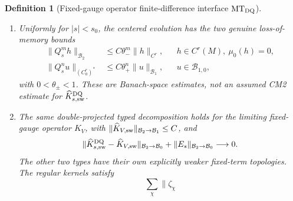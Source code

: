 \documentclass[11pt]{article}
\newtheorem{definition}[theorem]{Definition}
\newcommand{\cB}{\mathcal B}
\begin{document}
\begin{definition}[Fixed-gauge operator finite-difference interface
$\mathrm{MT}_{\rm DQ}$]
\begin{enumerate}[label=\textup{(MT\arabic*)}]
      while the graph-supported part belongs to the existing physical face
      atlas and obeys the uniform strong face ledger
      \begin{equation}
      \label{eq:uniform-gauge-DQ-face}
       \sup_{0<|s|<s_0}\sum_{\lambda}M_{s,\lambda}
       \|w_{s,\lambda}\|_{\mathcal A^\alpha}
       \mathfrak d_{s,\lambda}^{A_{\rm dom}}
       \operatorname{Mark}(s,\lambda)^2
       \{1+Z(\mathcal G_{s,\lambda}^-)
              +Z(\mathcal G_{s,\lambda}^+)\}<\infty .
      \end{equation}
      This is the face summand of
      \eqref{eq:event-physical-norm}, not a convergence assertion.  Finally,
      \begin{equation}
      \label{eq:uniform-strong-weak-DQ}
       \sup_{0<|s|<s_0}
       \left(\|\widehat K_{s,\rm sw}^{\rm DQ}\|_{\cB_2\to\cB_1}
       +\|E_s\|_{\cB_2\to\cB_1}\right)<\infty.
      \end{equation}
      A graph-supported boundary contribution of the commutator is included
      in $\widehat K_{s,\rm face}^{\rm DQ}$; it is never called an $M\times M$
      density.
\item Uniformly for $|s|<s_0$, the centered evolution has the two genuine
      loss-of-memory bounds
      \begin{align}
       \|Q_s^mh\|_{\cB_2}
       &\le C\theta_-^m\|h\|_{C^r},
       &&h\in C^r(M),\ \mu_0(h)=0,
       \label{eq:strong-side-memory}\\
       \|Q_s^nu\|_{(C^r_0)^*}
       &\le C\theta_+^n\|u\|_{\cB_1},
       &&u\in\cB_{1,0},
       \label{eq:response-side-memory}
      \end{align}
      with $0<\theta_\pm<1$.  These are Banach-space estimates, not an
      assumed CM2 estimate for $\widehat K_{s,\rm sw}^{\rm DQ}$.
\item The same double-projected typed decomposition holds for the limiting
      fixed-gauge operator $K_V$, with
      $\|\widehat K_{V,\rm sw}\|_{\cB_2\to\cB_1}\le C$, and
      \begin{equation}
      \label{eq:strong-DQ-convergence}
       \|\widehat K_{s,\rm sw}^{\rm DQ}-\widehat K_{V,\rm sw}\|_{\cB_2\to\cB_0}
       +\|E_s\|_{\cB_2\to\cB_0}\longrightarrow0.
      \end{equation}
      The other two types have their own explicitly weaker fixed-term
      topologies.  The regular kernels satisfy
      \begin{equation}
      \label{eq:regular-DQ-weak-convergence}
       \sum_\chi\|\zeta_\chi

\end{equation}
\end{enumerate}
\end{definition}
\end{document}
